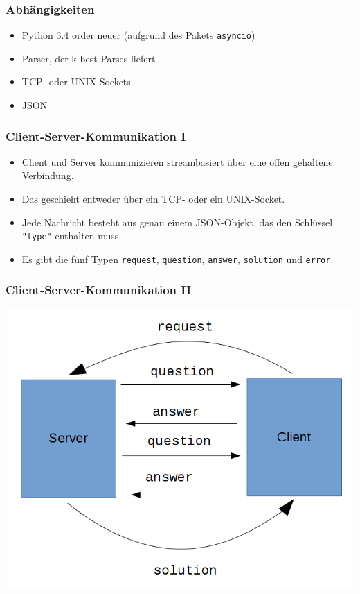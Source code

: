 \documentclass{beamer} %
\begin{document}
\begin{frame}
    \frametitle{Abhängigkeiten}
    \begin{itemize}
        \item Python 3.4 order neuer (aufgrund des Pakets \texttt{asyncio})
        \item Parser, der k-best Parses liefert
        \item TCP- oder UNIX-Sockets
        \item JSON
    \end{itemize}
\end{frame}

\begin{frame}
    \frametitle{Client-Server-Kommunikation I}
    \begin{itemize}
        \item Client und Server kommunizieren streambasiert über eine offen gehaltene Verbindung.
        \item Das geschieht entweder über ein TCP- oder ein UNIX-Socket.
        \item Jede Nachricht besteht aus genau einem JSON-Objekt, das den Schlüssel \texttt{"type"} enthalten muss.
        \item Es gibt die fünf Typen \texttt{request}, \texttt{question}, \texttt{answer}, \texttt{solution} und \texttt{error}.
    \end{itemize}
\end{frame}

\begin{frame}
    \frametitle{Client-Server-Kommunikation II}
    \centering
    \includegraphics[scale=0.4]{server_client.png}
\end{frame}
\end{document}
